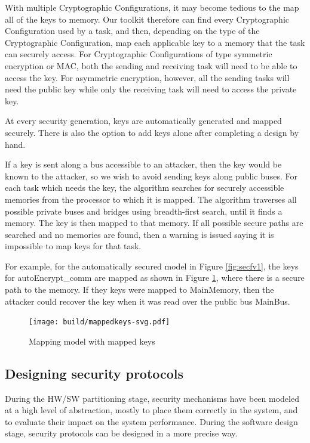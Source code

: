 \documentclass[12pt]{article}
\begin{document}
With multiple Cryptographic Configurations, it may become tedious to the map all of the keys to memory. Our toolkit therefore can find every Cryptographic Configuration used by a task, and then, depending on the type of the Cryptographic Configuration, map each applicable key to a memory that the task can securely access. For Cryptographic Configurations of type symmetric encryption or MAC, both the sending and receiving task will need to be able to access the key. For asymmetric encryption, however, all the sending tasks will need the public key while only the receiving task will need to access the private key. 

At every security generation, keys are automatically generated and mapped securely. There is also the option to add keys alone after completing a design by hand.

If a key is sent along a bus accessible to an attacker, then the key would be known to the attacker, so we wish to avoid sending keys along public buses. For each task which needs the key, the algorithm searches for securely accessible memories from the processor to which it is mapped. The algorithm traverses all possible private buses and bridges using breadth-first search, until it finds a memory. The key is then mapped to that memory. If all possible secure paths are searched and no memories are found, then a warning is issued saying it is impossible to map keys for that task.

For example, for the automatically secured model in Figure \ref{fig:secfv1}, the keys for autoEncrypt\_comm are mapped as shown in Figure \ref{fig:mapkey}, where there is a secure path to the memory. If they keys were mapped to MainMemory, then the attacker could recover the key when it was read over the public bus MainBus. 

\begin{figure}[htbp]
\centering
\texttt{[image: build/mappedkeys-svg.pdf]}
\caption{Mapping model with mapped keys} \label{fig:mapkey}
\end{figure}

\subsection{Designing security protocols}
During the HW/SW partitioning stage, security mechanisms have been modeled at a high level of abstraction, mostly to place them correctly in the system, and to evaluate their impact on the system performance. During the software design stage, security protocols can be designed in a more precise way.
\end{document}
